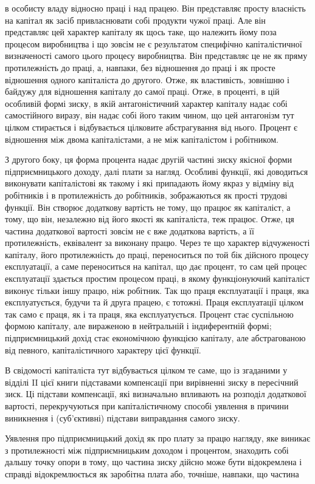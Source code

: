 \parcont{}  %
в особисту владу відносно праці і над працею. Він представляє
просту власність на капітал як засіб привласнювати собі продукти
чужої праці. Але він представляє цей характер капіталу як
щось таке, що належить йому поза процесом виробництва і що
зовсім не є результатом специфічно капіталістичної визначеності
самого цього процесу виробництва. Він представляє це не як
пряму протилежність до праці, а, навпаки, без відношення до
праці і як просте відношення одного капіталіста до другого.
Отже, як властивість, зовнішню і байдужу для відношення капіталу
до самої праці. Отже, в проценті, в цій особливій формі
зиску, в якій антагоністичний характер капіталу надає собі самостійного
виразу, він надає собі його таким чином, що цей антагонізм
тут цілком стирається і відбувається цілковите абстрагування
від нього. Процент є відношення між двома капіталістами,
а не між капіталістом і робітником.

З другого боку, ця форма процента надає другій частині
зиску якісної форми підприємницького доходу, далі плати за
нагляд. Особливі функції, які доводиться виконувати капіталістові
як такому і які припадають йому якраз у відміну від робітників
і в протилежність до робітників, зображаються як прості трудові
функції. Він створює додаткову вартість не тому, що працює
як капіталіст, а тому, що він, незалежно від його якості як
капіталіста, теж працює. Отже, ця частина додаткової вартості
зовсім не є вже додаткова вартість, а її протилежність, еквівалент
за виконану працю. Через те що характер відчуженості капіталу,
його протилежність до праці, переноситься по той бік дійсного
процесу експлуатації, а саме переноситься на капітал, що дає
процент, то сам цей процес експлуатації здається простим процесом
праці, в якому функціонуючий капіталіст виконує тільки
іншу працю, ніж робітник. Так що праця експлуатації і праця, яка
експлуатується, будучи та й друга працею, є тотожні. Праця
експлуатації цілком так само є праця, як і та праця, яка експлуатується.
Процент стає суспільною формою капіталу, але вираженою
в нейтральній і індиферентній формі; підприємницький
дохід стає економічною функцією капіталу, але абстрагованою
від певного, капіталістичного характеру цієї функції.

В свідомості капіталіста тут відбувається цілком те саме,
що із згаданими у відділі II цієї книги підставами компенсації
при вирівненні зиску в пересічний зиск. Ці підстави компенсації,
які визначально впливають на розподіл додаткової вартості,
перекручуються при капіталістичному способі уявлення
в причини виникнення і (суб’єктивні) підстави виправдання самого
зиску.

Уявлення про підприємницький дохід як про плату за працю
нагляду, яке виникає з протилежності між підприємницьким доходом
і процентом, знаходить собі дальшу точку опори в тому, що
частина зиску дійсно може бути відокремлена і справді відокремлюється
як заробітна плата або, точніше, навпаки, що частина
\parbreak{}  %
